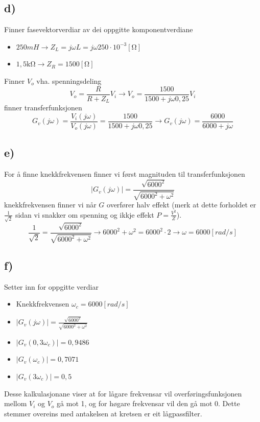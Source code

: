\documentclass[12pt,a4paper]{article}
\begin{document}
    \subsection*{d)}
    Finner fasevektorverdiar av dei oppgitte komponentverdiane
    \begin{itemize}
      \item $250mH \rightarrow Z_L = j\omega L = j\omega 250 \cdot 10^{-3}[\si{\ohm}]$
      \item $1,5\si{\kilo\ohm} \rightarrow Z_R = 1500[\si{\ohm}]$
    \end{itemize}
    Finner $V_o$ vha. spenningsdeling
    \begin{equation}
      V_o = \frac{R}{R+Z_L}V_i \rightarrow V_o = \frac{1500}{1500 + j\omega 0,25}V_i
    \end{equation}
    finner transferfunksjonen
    \begin{equation}
      G_v(j\omega) = \frac{V_i(j\omega)}{V_o(j\omega)} = \frac{1500}{1500+j\omega 0,25}
      \rightarrow G_v(j\omega) = \frac{6000}{6000 + j\omega}
    \end{equation}

    \subsection*{e)}
    For å finne knekkfrekvensen finner vi først magnituden til transferfunksjonen
    \begin{equation}
      |G_v(j\omega)| = \frac{\sqrt{6000^2}}{\sqrt{6000^2+\omega^2}}
    \end{equation}
    knekkfrekvensen finner vi når $G$ overfører halv effekt (merk at dette forholdet er
    $\frac{1}{\sqrt{2}}$ sidan vi snakker om spenning og ikkje effekt $P = \frac{V^2}{Z}$).
    \begin{equation}
      \frac{1}{\sqrt{2}} = \frac{\sqrt{6000^2}}{\sqrt{6000^2+\omega^2}}
      \rightarrow 6000^2 + \omega ^2 = 6000^2 \cdot 2
      \rightarrow \omega = 6000[rad/s]
    \end{equation}

    \subsection*{f)}
    Setter inn for oppgitte verdiar
    \begin{itemize}
      \item Knekkfrekvensen $\omega_c = 6000[rad/s]$
      \item $|G_v(j\omega)| = \frac{\sqrt{6000^2}}{\sqrt{6000^2+\omega^2}}$
      \item $|G_v(0,3\omega_c)| = 0,9486$
      \item $|G_v(\omega_c)| = 0,7071$
      \item $|G_v(3\omega_c)| = 0,5$
    \end{itemize}
    Desse kalkulasjonane viser at for lågare frekvensar vil overføringsfunksjonen mellom
    $V_i$ og $V_o$ gå mot 1, og for høgare frekvensar vil den gå mot 0.
    Dette stemmer overeins med antakelsen at kretsen er eit lågpassfilter.
\end{document}
